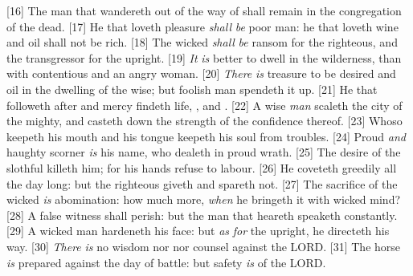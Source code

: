 [16] \textcolor[cmyk]{0.99998,1,0,0}{The man that wandereth out of the way of  shall remain in the congregation of the dead.}
[17] \textcolor[cmyk]{0.99998,1,0,0}{He that loveth pleasure \emph{shall} \emph{be}  poor man: he that loveth wine and oil shall not be rich.}
[18] \textcolor[cmyk]{0.99998,1,0,0}{The wicked \emph{shall} \emph{be}  ransom for the righteous, and the transgressor for the upright.}
[19] \textcolor[cmyk]{0.99998,1,0,0}{\emph{It} \emph{is} better to dwell in the wilderness, than with  contentious and an angry woman.}
[20] \textcolor[cmyk]{0.99998,1,0,0}{\emph{There} \emph{is} treasure to be desired and oil in the dwelling of the wise; but  foolish man spendeth it up.}
[21] \textcolor[cmyk]{0.99998,1,0,0}{He that followeth after  and mercy findeth life, , and .}
[22] \textcolor[cmyk]{0.99998,1,0,0}{A wise \emph{man} scaleth the city of the mighty, and casteth down the strength of the confidence thereof.}
[23] \textcolor[cmyk]{0.99998,1,0,0}{Whoso keepeth his mouth and his tongue keepeth his soul from troubles.}
[24] \textcolor[cmyk]{0.99998,1,0,0}{Proud \emph{and} haughty scorner \emph{is} his name, who dealeth in proud wrath.}
[25] \textcolor[cmyk]{0.99998,1,0,0}{The desire of the slothful killeth him; for his hands refuse to labour.}
[26] \textcolor[cmyk]{0.99998,1,0,0}{He coveteth greedily all the day long: but the righteous giveth and spareth not.}
[27] \textcolor[cmyk]{0.99998,1,0,0}{The sacrifice of the wicked \emph{is} abomination: how much more, \emph{when} he bringeth it with  wicked mind?}
[28] \textcolor[cmyk]{0.99998,1,0,0}{A false witness shall perish: but the man that heareth speaketh constantly.}
[29] \textcolor[cmyk]{0.99998,1,0,0}{A wicked man hardeneth his face: but \emph{as} \emph{for} the upright, he directeth his way.}
[30] \textcolor[cmyk]{0.99998,1,0,0}{\emph{There} \emph{is} no wisdom nor  nor counsel against the LORD.}
[31] \textcolor[cmyk]{0.99998,1,0,0}{The horse \emph{is} prepared against the day of battle: but safety \emph{is} of the LORD.}



